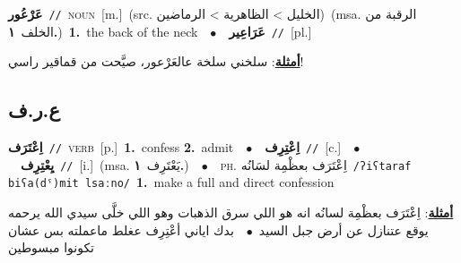 \documentclass[10pt,a4paper,twoside]{article} %
\begin{document}
\begin{multicols}{2}
{\setlength\topsep{0pt}\textbf{\foreignlanguage{arabic}{عَرْعُور}}\ {\color{gray}\texttt{//}\color{black}}\ \textsc{noun}\ [m.]\ (src. \color{gray}\foreignlanguage{arabic}{الخليل > الظاهرية > الرماضين}\color{black})\ \color{gray}(msa. \foreignlanguage{arabic}{الرقبة من الخلف}~\foreignlanguage{arabic}{\textbf{١.}})\color{black}\ \textbf{1.}~the back of the neck\ \ $\bullet$\ \ \setlength\topsep{0pt}\textbf{\foreignlanguage{arabic}{عَرَاعِير}}\ {\color{gray}\texttt{//}\color{black}}\ [pl.]\  \begin{flushright}\color{gray}\foreignlanguage{arabic}{\textbf{\underline{\foreignlanguage{arabic}{أمثلة}}}: سلخني سلخة عالعَرْعور، صيَّحت من قماقير راسي!}\end{flushright}\color{black}} \vspace{2mm}

\vspace{-3mm}
\subsection*{\color{blue}\foreignlanguage{arabic}{ع.ر.ف}\color{blue}{}} 

{\setlength\topsep{0pt}\textbf{\foreignlanguage{arabic}{اِعْتَرَف}}\ {\color{gray}\texttt{//}\color{black}}\ \textsc{verb}\ [p.]\ \textbf{1.}~confess  \textbf{2.}~admit\ \ $\bullet$\ \ \setlength\topsep{0pt}\textbf{\foreignlanguage{arabic}{اِعْتِرِف}}\ {\color{gray}\texttt{//}\color{black}}\ [c.]\ \ $\bullet$\ \ \setlength\topsep{0pt}\textbf{\foreignlanguage{arabic}{يِعْتِرِف}}\ {\color{gray}\texttt{//}\color{black}}\ [i.]\ \color{gray}(msa. \foreignlanguage{arabic}{يَعْتَرِف}~\foreignlanguage{arabic}{\textbf{١.}})\color{black}\ \ $\bullet$\ \ \textsc{ph.} \color{gray} \foreignlanguage{arabic}{اِعْتَرَف بعظْمِة لسَانُه}\color{black}\ {\color{gray}\texttt{/{\sffamily ʔiʕtaraf biʕa(dˤ)mit lsaːno}/}\color{black}}\ \textbf{1.}~make a full and direct confession\  \begin{flushright}\color{gray}\foreignlanguage{arabic}{\textbf{\underline{\foreignlanguage{arabic}{أمثلة}}}: اِعْتَرَف بعظْمِة لسانُه انه هو اللي سرق الذهبات وهو اللي خلَّى سيدي الله يرحمه يوقع عتنازل عن أرض جبل السيد\ $\bullet$\ \  بدك اياني أعْتِرِف عغلط ماعملته بس عشان تكونوا مبسوطين}\end{flushright}\color{black}} \vspace{2mm}


\end{multicols}
\end{document}
